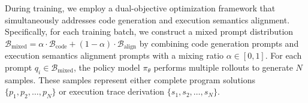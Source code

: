 \documentclass{article}
\makeatletter
\DeclareRobustCommand\onedot{\futurelet\@let@token\@onedot}
\def\@onedot{\ifx\@let@token.\else.\null\fi\xspace}
\def\eg{\emph{e.g}\onedot} \def\Eg{\emph{e.g}\onedot}
\theoremstyle{definition}
\theoremstyle{remark}
\newcounter{prompt}
\makeatother
\begin{document}


During training, we employ a dual-objective optimization framework
 that simultaneously addresses code generation and execution semantics alignment. Specifically, for each training batch, we construct a mixed prompt distribution $\mathcal{B}_{\text{mixed}} = \alpha \cdot \mathcal{B}_{\text{code}} + (1-\alpha) \cdot \mathcal{B}_{\text{align}}$ by combining code generation prompts and execution semantics alignment prompts with a mixing ratio $\alpha \in [0,1]$.
For each prompt $q_i \in \mathcal{B}_{\text{mixed}}$, the policy model $\pi_\theta$ performs multiple rollouts to generate $N$ samples. These samples represent either complete program solutions $\{p_1, p_2, \ldots, p_N\}$ or execution trace derivation $\{s_1, s_2, \ldots, s_N\}$. 
\end{document}
